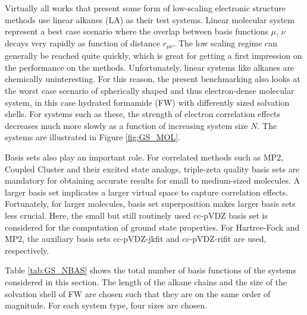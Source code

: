 Virtually all works that present some form of low-scaling electronic structure methods use linear alkanes (LA) as their test systems. Linear molecular system represent a best case scenario where the overlap between basis functions $\mu$, $\nu$ decays very rapidly as function of distance $r_{\mu\nu}$. The low scaling regime can generally be reached quite quickly, which is great for getting a first impression on the performance on the methods. Unfortunately, linear systems like alkanes are chemically uninteresting. For this reason, the present benchmarking also looks at the worst case scenario of spherically shaped and thus electron-dense molecular system, in this case hydrated formamide (FW) with differently sized solvation shells. For systems such as these, the strength of electron correlation effects decreases much more slowly as a function of increasing system size $N$. The systems are illustrated in Figure \ref{fig:GS_MOL}.

Basis sets also play an important role. For correlated methods such as MP2, Coupled Cluster and their excited state analogs, triple-zeta quality basis sets are mandatory for obtaining accurate results for small to medium-sized molecules. A larger basis set implicates a larger virtual space to capture correlation effects. Fortunately, for larger molecules, basis set superposition makes larger basis sets less crucial. Here, the small but still routinely used cc-pVDZ basis set is considered for the computation of ground state properties. For Hartree-Fock and MP2, the auxiliary basis sets cc-pVDZ-jkfit and cc-pVDZ-rifit are used, respectively.

Table \ref{tab:GS_NBAS} shows the total number of basis functions of the systems considered in this section. The length of the alkane chains and the size of the solvation shell of FW are chosen such that they are on the same order of magnitude. For each system type, four sizes are chosen.

